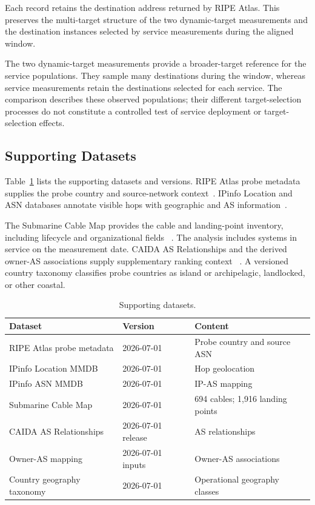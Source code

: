 Each record retains the destination address returned by RIPE Atlas. This
preserves the multi-target structure of the two dynamic-target measurements
and the destination instances selected by service measurements during the
aligned window.

The two dynamic-target measurements provide a broader-target reference
for the service populations. They sample many destinations during the
window, whereas service measurements retain the destinations selected for
each service. The comparison describes these observed populations;
their different target-selection processes do not constitute a controlled
test of service deployment or target-selection effects.

\subsection{Supporting Datasets}
\label{subsec:supporting_data}

Table~\ref{tab:supporting_datasets} lists the supporting datasets and versions.
RIPE Atlas probe metadata supplies the probe country and source-network
context~\cite{ripe_atlas}. IPinfo Location and ASN databases annotate visible
hops with geographic and AS information~\cite{ipinfo}.

The Submarine Cable Map provides the cable and landing-point inventory,
including lifecycle and organizational fields
~\cite{telegeography_submarine_map}. The analysis includes systems in service
on the measurement date. CAIDA AS Relationships and the derived owner-AS
associations supply supplementary ranking context
~\cite{caida_as_relationships}. A versioned country taxonomy classifies probe
countries as island or archipelagic, landlocked, or other coastal.

\begin{table}[htb]
  \centering
  \caption{Supporting datasets.}
  \label{tab:supporting_datasets}
  \footnotesize
  \begin{tabular}{p{}p{}p{}}
    \toprule
    Dataset & Version & Content \\
    \midrule
    RIPE Atlas probe metadata & 2026-07-01 & Probe country and source ASN \\
    IPinfo Location MMDB & 2026-07-01 & Hop geolocation \\
    IPinfo ASN MMDB & 2026-07-01 & IP-AS mapping \\
    Submarine Cable Map & 2026-07-01 & 694 cables; 1,916 landing points \\
    CAIDA AS Relationships & 2026-07-01 release & AS relationships \\
    Owner-AS mapping & 2026-07-01 inputs & Owner-AS associations \\
    Country geography taxonomy & 2026-07-01 & Operational geography classes \\
    \bottomrule
  \end{tabular}
\end{table}

